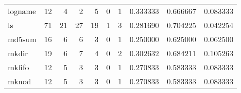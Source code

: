 \begin{tabular}{lrrrrrrrrr}
logname   &                                      12 &                                                  4 &                                                  2 &                                                  5 &                                                  0 &                                                  1 &                                           0.333333 &                               0.666667 &                             0.083333 \\
ls        &                                      71 &                                                 21 &                                                 27 &                                                 19 &                                                  1 &                                                  3 &                                           0.281690 &                               0.704225 &                             0.042254 \\
md5sum    &                                      16 &                                                  6 &                                                  6 &                                                  3 &                                                  0 &                                                  1 &                                           0.250000 &                               0.625000 &                             0.062500 \\
mkdir     &                                      19 &                                                  6 &                                                  7 &                                                  4 &                                                  0 &                                                  2 &                                           0.302632 &                               0.684211 &                             0.105263 \\
mkfifo    &                                      12 &                                                  5 &                                                  3 &                                                  3 &                                                  0 &                                                  1 &                                           0.270833 &                               0.583333 &                             0.083333 \\
mknod     &                                      12 &                                                  5 &                                                  3 &                                                  3 &                                                  0 &                                                  1 &                                           0.270833 &                               0.583333 &                             0.083333 \\

\end{tabular}
